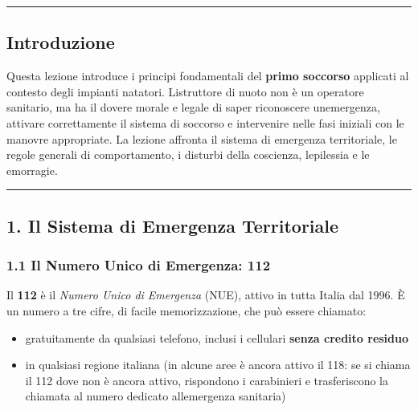 \documentclass[a4paper,11pt]{article}
\providecommand{\tightlist}{%
  \setlength{\itemsep}{0pt}\setlength{\parskip}{0pt}}
\begin{document}
\begin{center}\rule{0.5\linewidth}{0.5pt}\end{center}

\subsection{Introduzione}\label{introduzione-7}

Questa lezione introduce i principi fondamentali del \textbf{primo
      soccorso} applicati al contesto degli impianti natatori.
L\textquotesingle istruttore di nuoto non è un operatore sanitario, ma
ha il dovere morale e legale di saper riconoscere
un\textquotesingle emergenza, attivare correttamente il sistema di
soccorso e intervenire nelle fasi iniziali con le manovre appropriate.
La lezione affronta il sistema di emergenza territoriale, le regole
generali di comportamento, i disturbi della coscienza,
l\textquotesingle epilessia e le emorragie.

\begin{center}\rule{0.5\linewidth}{0.5pt}\end{center}

\subsection{1. Il Sistema di Emergenza
      Territoriale}\label{il-sistema-di-emergenza-territoriale}

\subsubsection{1.1 Il Numero Unico di Emergenza:
      112}\label{il-numero-unico-di-emergenza-112}

Il \textbf{112} è il \emph{Numero Unico di Emergenza} (NUE), attivo in
tutta Italia dal 1996. È un numero a tre cifre, di facile
memorizzazione, che può essere chiamato:

\begin{itemize}
      \tightlist
      \item
            gratuitamente da qualsiasi telefono, inclusi i cellulari \textbf{senza
                  credito residuo}
      \item
            in qualsiasi regione italiana (in alcune aree è ancora attivo il 118:
            se si chiama il 112 dove non è ancora attivo, rispondono i carabinieri
            e trasferiscono la chiamata al numero dedicato
            all\textquotesingle emergenza sanitaria)
\end{itemize}
\end{document}

